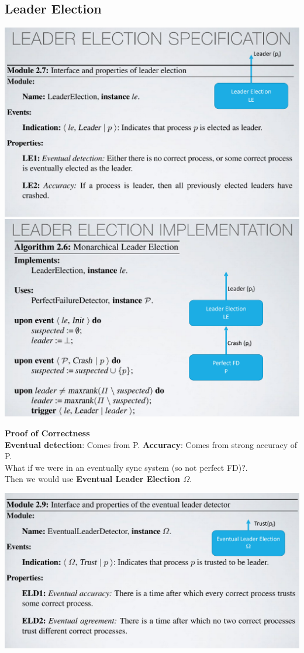 \documentclass[11pt, a4paper]{article}
\begin{document}
\subsection{Leader Election}
\begin{center}
    \includegraphics[scale=0.5]{img/LE/leader_prop.png}
    \includegraphics[scale=0.5]{img/LE/leader_algo.png}
\end{center}
\textbf{Proof of Correctness}\\
\textbf{Eventual detection}: Comes from P.
\textbf{Accuracy}: Comes from strong accuracy of P.\\
What if we were in an eventually sync system (so not perfect FD)?.\\
Then we would use \textbf{Eventual Leader Election $\Omega$}.
\begin{center}
    \includegraphics[scale=0.5]{img/LE/ele-prop.png}
\end{center}
\end{document}
